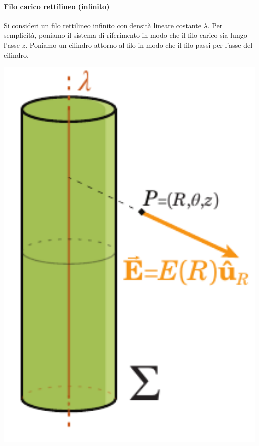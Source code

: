 \paragraph{Filo carico rettilineo (infinito)}
	Si consideri un filo rettilineo infinito con densità lineare costante $\lambda$. Per semplicità, poniamo il sistema di riferimento in modo che il filo carico sia lungo l'asse $z$. Poniamo un cilindro attorno al filo in modo che il filo passi per l'asse del cilindro.\\
	\begin{minipage}{0.29\textwidth}
		\begin{center}
			\includegraphics[width=1\textwidth]{images/chp2/chp2filoinfinito.pdf}
		\end{center}		%
	\end{minipage}\hspace{10pt}
